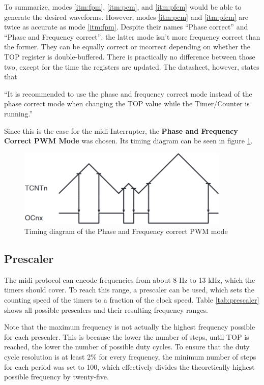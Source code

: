 To summarize, modes \ref{itm:fpm}, \ref{itm:pcm}, and \ref{itm:pfcm} would be able to generate the desired waveforms. However, modes \ref{itm:pcm} and \ref{itm:pfcm} are twice as accurate as mode \ref{itm:fpm}. Despite their names \enquote{Phase correct} and \enquote{Phase and Frequency correct}, the latter mode isn't more frequency correct than the former. They can be equally correct or incorrect depending on whether the TOP register is double-buffered. There is practically no difference between those two, except for the time the registers are updated. The datasheet, however, states that

\begin{displayquote}
\enquote{It is recommended to use the phase and frequency correct mode instead of the phase correct mode when changing the TOP value while the Timer/Counter is running.}
\end{displayquote}

Since this is the case for the \gls{midi}-Interrupter, the \textbf{Phase and Frequency Correct PWM Mode} was chosen. Its timing diagram can be seen in figure \ref{fig:timer_diagram}.

\begin{figure}[h!]
    \centering
    \includegraphics[width=0.9\textwidth]{felix/resources/timer_diagram.png}
    \caption{Timing diagram of the Phase and Frequency correct PWM mode}
    \label{fig:timer_diagram}
\end{figure}

\subsection{Prescaler}

The \gls{midi} protocol can encode frequencies from about 8 Hz to 13 kHz, which the timers should cover. To reach this range, a prescaler can be used, which sets the counting speed of the timers to a fraction of the clock speed. Table \ref{tab:prescaler} shows all possible prescalers and their resulting frequency ranges.

Note that the maximum frequency is not actually the highest frequency possible for each prescaler. This is because the lower the number of steps, until TOP is reached, the lower the number of possible duty cycles. To ensure that the duty cycle resolution is at least 2\% for every frequency, the minimum number of steps for each period was set to 100, which effectively divides the theoretically highest possible frequency by twenty-five.

